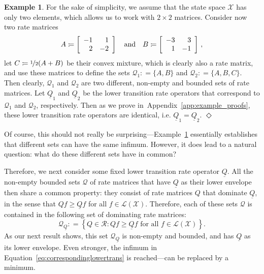 \documentclass[10pt,a4paper]{paper}
\theoremstyle{definition}
\newtheorem{exmp}{Example}
\newcommand{\states}{\mathcal{X}}
\newcommand{\gambles}{\mathcal{L}}
\newcommand{\gamblesX}{\gambles(\states)}
\newcommand{\rateset}{\mathcal{Q}}
\newcommand{\lrate}{\underline{Q}}
\newcommand{\coloneqq}{:\!=}
\newcommand{\exampleend}{\hfill$\Diamond$}
\newcommand{\exampleproofref}{Appendix~\ref{app:example_proofs}}
\begin{document}
\begin{exmp}\label{example:different_sets_same_lower_rate}
For the sake of simplicity, we assume that the state space $\states$ has only two elements, which allows us to work with $2\times 2$ matrices. Consider now two rate matrices
\begin{equation*}
A\coloneqq\left[\begin{array}{rr}-1 & 1 \\2 & -2\end{array}\right]\quad\text{and}\quad
B\coloneqq\left[\begin{array}{rr}-3 & 3 \\1 & -1\end{array}\right]\,,
\vspace{7pt}
\end{equation*}
let $C\coloneqq \nicefrac{1}{2}(A+B)$ be their convex mixture, which is clearly also a rate matrix, and use these matrices to define the sets $\rateset_1\coloneqq\{A,B\}$ and $\rateset_2\coloneqq\{A,B,C\}$. Then clearly, $\rateset_1$ and $\rateset_2$ are two different, non-empty and bounded sets of rate matrices. Let $\lrate_1$ and $\lrate_2$ be the lower transition rate operators that correspond to $\rateset_1$ and $\rateset_2$, respectively. Then as we prove in~\exampleproofref, these lower transition rate operators are identical, i.e. $\lrate_1=\lrate_2$.
\exampleend
\end{exmp}
Of course, this should not really be surprising---Example~\ref{example:different_sets_same_lower_rate} essentially establishes that different sets can have the same infimum. However, it does lead to a natural question: what do these different sets have in common?

Therefore, we next consider some fixed lower transition rate operator $\lrate$.
All the non-empty bounded sets $\rateset$ of rate matrices that have $\lrate$ as their lower envelope then share a common property: they consist of rate matrices $Q$ that dominate $\lrate$, in the sense that $Qf\geq\lrate f$ for all $f\in\gamblesX$. Therefore, each of these sets $\rateset$ is contained in the following set of dominating rate matrices:
\begin{equation}\label{eq:dominatingratematrices}
\rateset_{\lrate}\coloneqq
\left\{
Q\in\mathcal{R}
\colon
Qf\geq\lrate f\text{ for all $f\in\gamblesX$}
\right\}.
\end{equation}
As our next result shows, this set $\rateset_{\lrate}$ is non-empty and bounded, and has $\lrate$ as its lower envelope. Even stronger, the infimum in Equation~\eqref{eq:correspondinglowertrans} is reached---can be replaced by a minimum.
\end{document}
